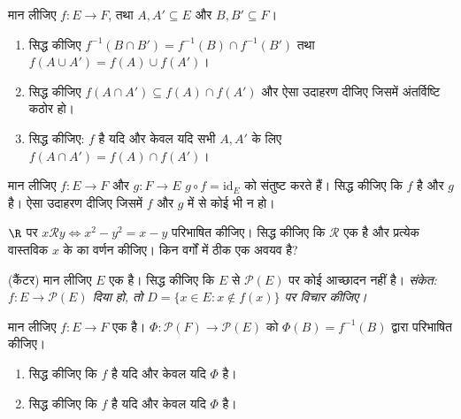 \begin{exercise}[$\star\star$]\label{exo:b1:logic:8}
मान लीजिए $f \colon E \to F$, तथा $A, A' \subseteq E$ और $B, B' \subseteq
F$।
\begin{enumerate}
  \item सिद्ध कीजिए $f^{-1}(B \cap B') = f^{-1}(B) \cap f^{-1}(B')$ तथा $f(A
  \cup A') = f(A) \cup f(A')$।
  \item सिद्ध कीजिए $f(A \cap A') \subseteq f(A) \cap f(A')$ और ऐसा उदाहरण
  दीजिए जिसमें अंतर्विष्टि कठोर हो।
  \item सिद्ध कीजिए: $f$  है यदि और केवल यदि सभी $A, A'$ के लिए $f(A
  \cap A') = f(A) \cap f(A')$।
\end{enumerate}
\end{exercise}

\begin{exercise}[$\star\star$]\label{exo:b1:logic:9}
मान लीजिए $f \colon E \to F$ और $g \colon F \to E$ $g \circ f =
\mathrm{id}_E$ को संतुष्ट करते हैं। सिद्ध कीजिए कि $f$  है और $g$
 है। ऐसा उदाहरण दीजिए जिसमें $f$ और $g$ में से कोई भी  न
हो।
\end{exercise}

\begin{exercise}[$\star\star$]\label{exo:b1:logic:10}
$\R$ पर $x \mathbin{\mathcal{R}} y \iff x^2 - y^2 = x - y$ परिभाषित कीजिए।
सिद्ध कीजिए कि $\mathcal{R}$ एक  है और प्रत्येक वास्तविक $x$ के
 का वर्णन कीजिए। किन वर्गों में ठीक एक अवयव है?
\end{exercise}

\begin{exercise}[$\star\star\star$]\label{exo:b1:logic:11}
(कैंटर) मान लीजिए $E$ एक  है। सिद्ध कीजिए कि $E$ से $\mathcal{P}(E)$
पर कोई आच्छादन नहीं है। \emph{संकेत: $f \colon E \to \mathcal{P}(E)$ दिया
हो, तो $D = \{x \in E : x \notin f(x)\}$ पर विचार कीजिए।}
\end{exercise}

\begin{exercise}[$\star\star\star$]\label{exo:b1:logic:12}
मान लीजिए $f \colon E \to F$ एक  है। $\Phi \colon \mathcal{P}(F)
\to \mathcal{P}(E)$ को $\Phi(B) = f^{-1}(B)$ द्वारा परिभाषित कीजिए।
\begin{enumerate}
  \item सिद्ध कीजिए कि $f$  है यदि और केवल यदि $\Phi$  है।
  \item सिद्ध कीजिए कि $f$  है यदि और केवल यदि $\Phi$  है।
\end{enumerate}
\end{exercise}

